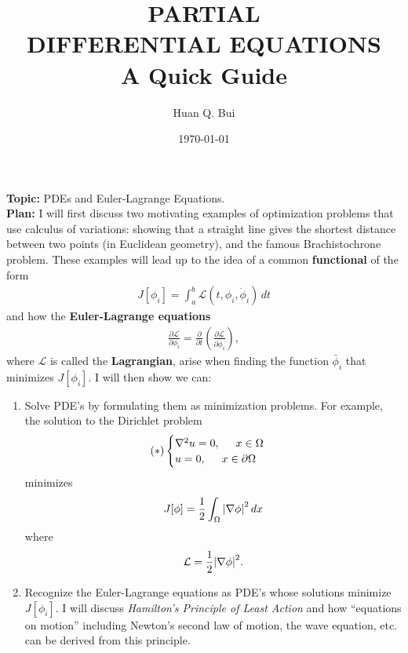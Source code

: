 \documentclass{article}
\theoremstyle{definition}
\newcommand{\p}{\partial}
\newcommand{\lag}{\mathcal{L}}
\newcommand{\f}[2]{\frac{#1}{#2}}
\newcommand{\lp}{\left(}
\newcommand{\rp}{\right)}
\begin{document}
	
	\begin{titlepage}\centering
		\clearpage
		\title{\textsc{\bf{PARTIAL\\ DIFFERENTIAL EQUATIONS}}\\\smallskip A Quick Guide\\}
		\author{\bigskip Huan Q. Bui}
		\date{\today}
		\maketitle
		\thispagestyle{empty}
	\end{titlepage}

\noindent \textbf{Topic:} PDEs and Euler-Lagrange Equations.\\

\noindent \textbf{Plan:} I will first discuss two motivating examples of optimization problems that use calculus of variations: showing that a straight line gives the shortest distance between two points (in Euclidean geometry), and the famous Brachistochrone problem. These examples will lead up to the idea of a common \textbf{functional} of the form
\begin{align*}
J[\phi_i] = \int^b_a \lag(t,\phi_i,\dot{\phi}_i)\,dt
\end{align*}
and how the \textbf{Euler-Lagrange equations}
\begin{align*}
\f{\p \lag }{\p \phi_i} = \f{\p}{\p t} \lp\f{\p \lag}{\p \dot{\phi}_i}\rp,
\end{align*}
where $\lag$ is called the \textbf{Lagrangian}, arise when finding the function $\bar{\phi}_i$ that minimizes $J[\phi_i]$. I will then show we can:
\begin{enumerate}
	\item Solve PDE's by formulating them as minimization problems. For example, the solution to the Dirichlet problem 
	\begin{align*}
	(\ast) \begin{cases}
	\nabla^2u = 0, \hspace{0.5cm}  \text{$x\in \Omega$}\\
	u = 0, \hspace{0.5cm} \text{$x \in \p \Omega$}
	\end{cases}
	\end{align*}
	minimizes 
	\begin{align*}
	J[\phi] = \f{1}{2}\int_\Omega \abs{\nabla \phi}^2\,dx
	\end{align*}
	where
	\begin{align*}
	\lag = \f{1}{2}\abs{\nabla \phi}^2.
	\end{align*}
	\item Recognize the Euler-Lagrange equations as PDE's whose solutions minimize $J[\phi_i]$. I will discuss \textit{Hamilton's Principle of Least Action} and how ``equations on motion'' including Newton's second law of motion, the wave equation, etc. can be derived from this principle. 
\end{enumerate}
\end{document}
